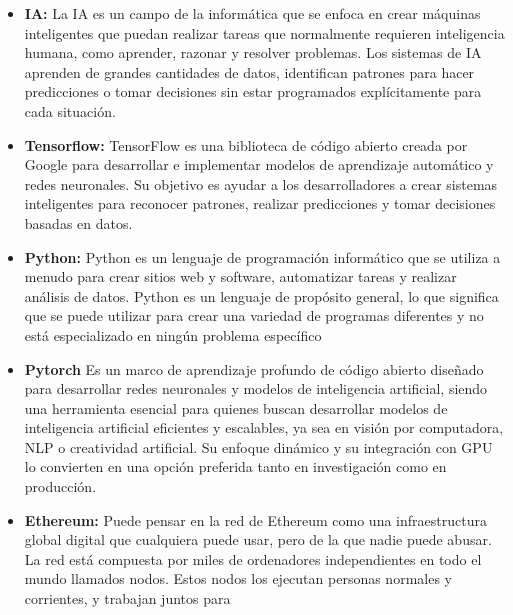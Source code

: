 \documentclass[oneside,11pt]{Latex/Classes/PhDthesisPSnPDF}
\begin{document}
\begin{itemize}
  estructura garantiza que los datos sean transparentes, seguros e
  inmutables, y es prácticamente imposible cambiar los datos almacenados
  en un bloque después de confirmarlo y agregarlo a la cadena. Existen
  diferentes tipos de blockchains con diversos grados de
  descentralización, aun así, el término ``blockchain'' suele hacer
  referencia a un libro de contabilidad digital descentralizado que se
  utiliza para registrar transacciones de criptomonedas.
\item
  \textbf{IA:} La IA es un campo de la informática que se enfoca en
  crear máquinas inteligentes que puedan realizar tareas que normalmente
  requieren inteligencia humana, como aprender, razonar y resolver
  problemas. Los sistemas de IA aprenden de grandes cantidades de datos,
  identifican patrones para hacer predicciones o tomar decisiones sin
  estar programados explícitamente para cada situación.
\item
  \textbf{Tensorflow:} TensorFlow es una biblioteca de código abierto
  creada por Google para desarrollar e implementar modelos de
  aprendizaje automático y redes neuronales. Su objetivo es ayudar a los
  desarrolladores a crear sistemas inteligentes para reconocer patrones,
  realizar predicciones y tomar decisiones basadas en datos.
\item
  \textbf{Python:} Python es un lenguaje de programación informático que
  se utiliza a menudo para crear sitios web y software, automatizar
  tareas y realizar análisis de datos. Python es un lenguaje de
  propósito general, lo que significa que se puede utilizar para crear
  una variedad de programas diferentes y no está especializado en ningún
  problema específico
\item
  \textbf{Pytorch} Es un marco de aprendizaje profundo de código abierto
  diseñado para desarrollar redes neuronales y modelos de inteligencia
  artificial, siendo una herramienta esencial para quienes buscan
  desarrollar modelos de inteligencia artificial eficientes y
  escalables, ya sea en visión por computadora, NLP o creatividad
  artificial. Su enfoque dinámico y su integración con GPU lo convierten
  en una opción preferida tanto en investigación como en producción.
\item
  \textbf{Ethereum:} Puede pensar en la red de Ethereum como una
  infraestructura global digital que cualquiera puede usar, pero de la
  que nadie puede abusar. La red está compuesta por miles de ordenadores
  independientes en todo el mundo llamados nodos. Estos nodos los
  ejecutan personas normales y corrientes, y trabajan juntos para

\end{itemize}
\end{document}
